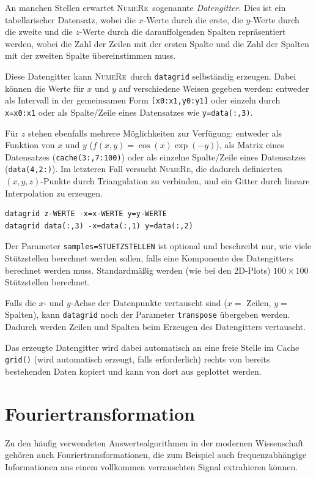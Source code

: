 \documentclass[DIV=14,headsepline,footsepline]{scrbook}
\newcommand{\NR}{\textsc{Nu\-me\-Re}}
\begin{document}
				An manchen Stellen erwartet \NR\ sogenannte \emph{Datengitter}. Dies ist ein tabellarischer Datensatz, wobei die $x$-Werte durch die erste, die $y$-Werte durch die zweite und die $z$-Werte durch die darauffolgenden Spalten repräsentiert werden, wobei die Zahl der Zeilen mit der ersten Spalte und die Zahl der Spalten mit der zweiten Spalte übereinstimmen muss.
				
				Diese Datengitter kann \NR\ durch \lstinline+datagrid+ selbständig erzeugen. Dabei können die Werte für $x$ und $y$ auf verschiedene Weisen gegeben werden: entweder als Intervall in der gemeinsamen Form \lstinline+[x0:x1,y0:y1]+ oder einzeln durch \lstinline+x=x0:x1+ oder als Spalte/Zeile eines Datensatzes wie \lstinline+y=data(:,3)+.
				
				Für $z$ stehen ebenfalls mehrere Möglichkeiten zur Verfügung: entweder als Funktion von $x$ und $y$ ($f(x,y) = \cos(x)\exp(-y)$), als Matrix eines Datensatzes (\lstinline+cache(3:,7:100)+) oder als einzelne Spalte/Zeile eines Datensatzes (\lstinline+data(4,2:)+). Im letzteren Fall versucht \NR, die dadurch definierten $(x,y,z)$-Punkte durch Triangulation zu verbinden, und ein Gitter durch lineare Interpolation zu erzeugen.
				\begin{lstlisting}
datagrid z-WERTE -x=x-WERTE y=y-WERTE
datagrid data(:,3) -x=data(:,1) y=data(:,2)
				\end{lstlisting}
				
				Der Parameter \lstinline+samples=STUETZSTELLEN+ ist optional und beschreibt nur, wie viele Stützstellen berechnet werden sollen, falls eine Komponente des Datengitters berechnet werden muss. Standardmäßig werden (wie bei den 2D-Plots) $100 \times 100$ Stützstellen berechnet.
				
				Falls die $x$- und $y$-Achse der Datenpunkte vertauscht sind ($x =$ Zeilen, $y =$ Spalten), kann \lstinline+datagrid+ noch der Parameter \lstinline+transpose+ übergeben werden. Dadurch werden Zeilen und Spalten beim Erzeugen des Datengitters vertauscht.
	
				Das erzeugte Datengitter wird dabei automatisch an eine freie Stelle im Cache \lstinline+grid()+ (wird automatisch erzeugt, falls erforderlich) rechts von bereits bestehenden Daten kopiert und kann von dort aus geplottet werden.
				
			\section{Fouriertransformation}
				Zu den häufig verwendeten Auswertealgorithmen in der modernen Wissenschaft gehören auch Fouriertransformationen, die zum Beispiel auch frequenzabhängige Informationen aus einem vollkommen verrauschten Signal extrahieren können.
				
\end{document}
